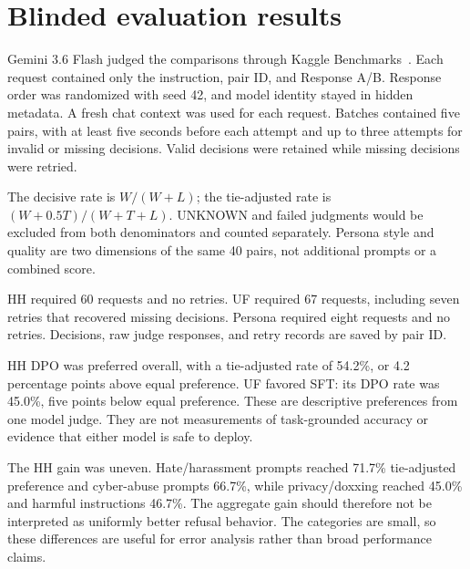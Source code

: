 \documentclass{article}
\begin{document}
\section{Blinded evaluation results}
Gemini 3.6 Flash judged the comparisons through Kaggle Benchmarks~\cite{kaggle}. Each request contained only the instruction, pair ID, and Response A/B. Response order was randomized with seed 42, and model identity stayed in hidden metadata. A fresh chat context was used for each request. Batches contained five pairs, with at least five seconds before each attempt and up to three attempts for invalid or missing decisions. Valid decisions were retained while missing decisions were retried.

\begin{table}[ht]
\centering
\caption{Candidate DPO/adapter preferences over the appropriate baseline. All 640 pairs were judged; there were no UNKNOWN decisions or failed pairs.}
\label{tab:results}

\end{table}

The decisive rate is $W/(W+L)$; the tie-adjusted rate is $(W+0.5T)/(W+T+L)$. UNKNOWN and failed judgments would be excluded from both denominators and counted separately. Persona style and quality are two dimensions of the same 40 pairs, not additional prompts or a combined score.

HH required 60 requests and no retries. UF required 67 requests, including seven retries that recovered missing decisions. Persona required eight requests and no retries. Decisions, raw judge responses, and retry records are saved by pair ID.

HH DPO was preferred overall, with a tie-adjusted rate of 54.2\%, or 4.2 percentage points above equal preference. UF favored SFT: its DPO rate was 45.0\%, five points below equal preference. These are descriptive preferences from one model judge. They are not measurements of task-grounded accuracy or evidence that either model is safe to deploy.

\begin{table}[ht]
\centering
\caption{HH results by prompt category. Each category contains 30 prompts.}
\label{tab:categories}

\end{table}

The HH gain was uneven. Hate/harassment prompts reached 71.7\% tie-adjusted preference and cyber-abuse prompts 66.7\%, while privacy/doxxing reached 45.0\% and harmful instructions 46.7\%. The aggregate gain should therefore not be interpreted as uniformly better refusal behavior. The categories are small, so these differences are useful for error analysis rather than broad performance claims.
\end{document}
